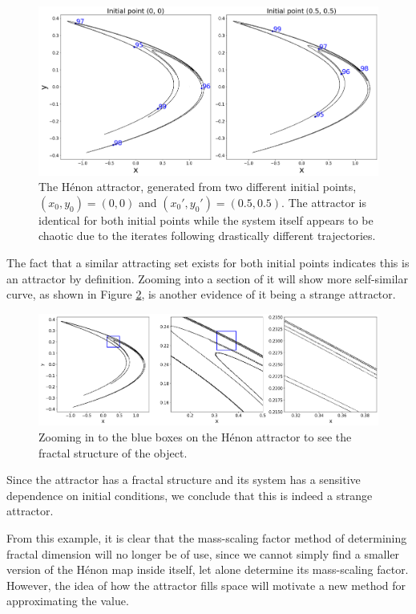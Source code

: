 \begin{exmp}
    \begin{figure}
        \centering
        \includegraphics[width=0.75\linewidth]{Images/Henon attractor with labels.png}
        \caption{The Hénon attractor, generated from two different initial points, $(x_0,y_0) = (0,0)$ and $(x_0',y_0') = (0.5,0.5)$. The attractor is identical for both initial points while the system itself appears to be chaotic due to the iterates following drastically different trajectories.}
        \label{fig:Henon2}
    \end{figure}
    The fact that a similar attracting set exists for both initial points indicates this is an attractor by definition.
    Zooming into a section of it will show more self-similar curve, as shown in Figure \ref{fig:Henon3}, is another evidence of it being a strange attractor. 
    \begin{figure}
        \centering
        \includegraphics[width=1\linewidth]{Images/henon zoom.png}
        \caption{Zooming in to the blue boxes on the Hénon attractor to see the fractal structure of the object.}
        \label{fig:Henon3}
    \end{figure}
    Since the attractor has a fractal structure and its system has a sensitive dependence on initial conditions, we conclude that this is indeed a strange attractor.
\end{exmp}
From this example, it is clear that the mass-scaling factor method of determining fractal dimension will no longer be of use, since we cannot simply find a smaller version of the Hénon map inside itself, let alone determine its mass-scaling factor. However, the idea of how the attractor fills space will motivate a new method for approximating the value.

